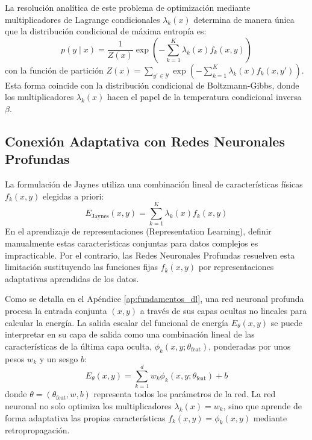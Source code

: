 La resolución analítica de este problema de optimización mediante multiplicadores de Lagrange condicionales $\lambda_k(x)$ determina de manera única que la distribución condicional de máxima entropía es:
\begin{equation}
\label{eq:solucion_jaynes}
p(y \mid x) = \frac{1}{Z(x)} \exp\left( - \sum_{k=1}^K \lambda_k(x) f_k(x, y) \right)
\end{equation}
con la función de partición $Z(x) = \sum_{y' \in \mathcal{Y}} \exp\left( - \sum_{k=1}^K \lambda_k(x) f_k(x, y') \right)$. Esta forma coincide con la distribución condicional de Boltzmann-Gibbs, donde los multiplicadores $\lambda_k(x)$ hacen el papel de la temperatura condicional inversa $\beta$.

\subsection{Conexión Adaptativa con Redes Neuronales Profundas}
\label{subsec:conexion_dnn}

La formulación de Jaynes utiliza una combinación lineal de características físicas $f_k(x, y)$ elegidas a priori:
\begin{equation}
E_{\text{Jaynes}}(x, y) = \sum_{k=1}^K \lambda_k(x) f_k(x, y)
\end{equation}
En el aprendizaje de representaciones (Representation Learning), definir manualmente estas características conjuntas para datos complejos es impracticable. Por el contrario, las Redes Neuronales Profundas resuelven esta limitación sustituyendo las funciones fijas $f_k(x, y)$ por representaciones adaptativas aprendidas de los datos.

Como se detalla en el Apéndice \ref{ap:fundamentos_dl}, una red neuronal profunda procesa la entrada conjunta $(x, y)$ a través de sus capas ocultas no lineales para calcular la energía. La salida escalar del funcional de energía $E_\theta(x, y)$ se puede interpretar en su capa de salida como una combinación lineal de las características de la última capa oculta, $\phi_k(x, y; \theta_{\text{feat}})$, ponderadas por unos pesos $w_k$ y un sesgo $b$:
\begin{equation}
E_\theta(x, y) = \sum_{k=1}^d w_k \phi_k(x, y; \theta_{\text{feat}}) + b
\end{equation}
donde $\theta = (\theta_{\text{feat}}, w, b)$ representa todos los parámetros de la red. La red neuronal no solo optimiza los multiplicadores $\lambda_k(x) = w_k$, sino que aprende de forma adaptativa las propias características $f_k(x, y)= \phi_k(x, y)$ mediante retropropagación. 


